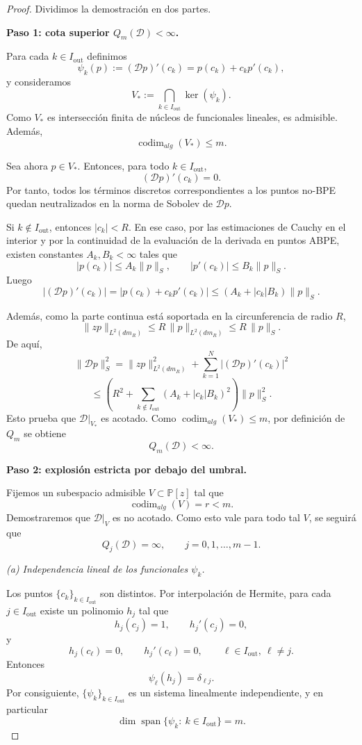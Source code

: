 \documentclass[12pt,a4paper]{article}
\theoremstyle{definition}
\theoremstyle{remark}
\begin{document}
\begin{proof}
	Dividimos la demostración en dos partes.

	\medskip
	\noindent
	\textbf{Paso 1: cota superior $Q_m(\mathcal D)<\infty$.}

	Para cada $k\in I_{\mathrm{out}}$ definimos
	\[
		\psi_k(p):=(\mathcal D p)'(c_k)=p(c_k)+c_kp'(c_k),
	\]
	y consideramos
	\[
		V_*:=\bigcap_{k\in I_{\mathrm{out}}}\ker(\psi_k).
	\]
	Como $V_*$ es intersección finita de núcleos de funcionales lineales, es admisible.
	Además,
	\[
		\operatorname{codim}_{alg}(V_*)\le m.
	\]

	Sea ahora $p\in V_*$. Entonces, para todo $k\in I_{\mathrm{out}}$,
	\[
		(\mathcal D p)'(c_k)=0.
	\]
	Por tanto, todos los términos discretos correspondientes a los puntos no-BPE quedan
	neutralizados en la norma de Sobolev de $\mathcal D p$.

	Si $k\notin I_{\mathrm{out}}$, entonces $|c_k|<R$. En ese caso, por las estimaciones
	de Cauchy en el interior y por la continuidad de la evaluación de la derivada en puntos
	ABPE, existen constantes $A_k,B_k<\infty$ tales que
	\[
		|p(c_k)|\le A_k\|p\|_S,
		\qquad
		|p'(c_k)|\le B_k\|p\|_S.
	\]
	Luego
	\[
		|(\mathcal D p)'(c_k)|
		=
		|p(c_k)+c_kp'(c_k)|
		\le
		(A_k+|c_k|B_k)\|p\|_S.
	\]

	Además, como la parte continua está soportada en la circunferencia de radio $R$,
	\[
		\|zp\|_{L^2(dm_R)}\le R\,\|p\|_{L^2(dm_R)}\le R\,\|p\|_S.
	\]
	De aquí,
	\[
		\|\mathcal D p\|_S^2
		=
		\|zp\|_{L^2(dm_R)}^2
		+
		\sum_{k=1}^N |(\mathcal D p)'(c_k)|^2
	\]
	\[
		\le
		\left(
		R^2+\sum_{k\notin I_{\mathrm{out}}}(A_k+|c_k|B_k)^2
		\right)\|p\|_S^2.
	\]
	Esto prueba que $\mathcal D|_{V_*}$ es acotado. Como
	$\operatorname{codim}_{alg}(V_*)\le m$, por definición de $Q_m$ se obtiene
	\[
		Q_m(\mathcal D)<\infty.
	\]

	\medskip
	\noindent
	\textbf{Paso 2: explosión estricta por debajo del umbral.}

	Fijemos un subespacio admisible $V\subset \mathbb P[z]$ tal que
	\[
		\operatorname{codim}_{alg}(V)=r<m.
	\]
	Demostraremos que $\mathcal D|_V$ es no acotado. Como esto vale para todo tal $V$,
	se seguirá que
	\[
		Q_j(\mathcal D)=\infty,\qquad j=0,1,\dots,m-1.
	\]

	\smallskip
	\noindent
	\emph{(a) Independencia lineal de los funcionales $\psi_k$.}

	Los puntos $\{c_k\}_{k\in I_{\mathrm{out}}}$ son distintos. Por interpolación de Hermite,
	para cada $j\in I_{\mathrm{out}}$ existe un polinomio $h_j$ tal que
	\[
		h_j(c_j)=1,\qquad h_j'(c_j)=0,
	\]
	y
	\[
		h_j(c_\ell)=0,\qquad h_j'(c_\ell)=0,
		\qquad \ell\in I_{\mathrm{out}},\ \ell\neq j.
	\]
	Entonces
	\[
		\psi_\ell(h_j)=\delta_{\ell j}.
	\]
	Por consiguiente, $\{\psi_k\}_{k\in I_{\mathrm{out}}}$ es un sistema linealmente independiente,
	y en particular
	\[
		\dim \operatorname{span}\{\psi_k:\ k\in I_{\mathrm{out}}\}=m.
	\]


\end{proof}
\end{document}
